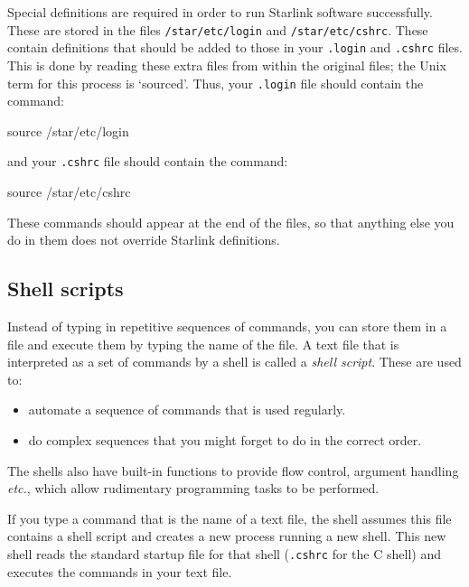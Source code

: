\documentclass[twoside,11pt,nolof]{starlink}
\begin{document}
Special definitions are required in order to run Starlink software successfully.
These are stored in the files \texttt{/star/etc/login} and \texttt{/star/etc/cshrc}.
These contain definitions that should be added to those in your \texttt{.login} and
\texttt{.cshrc} files.
This is done by reading these extra files from within the original files; the
Unix term for this process is `sourced'.
Thus, your \texttt{.login} file should contain the command:
\begin{terminalv}
source /star/etc/login
\end{terminalv}
and your \texttt{.cshrc} file should contain the command:
\begin{terminalv}
source /star/etc/cshrc
\end{terminalv}
These commands should appear at the end of the files, so that anything else
you do in them does not override Starlink definitions.

\subsection{Shell scripts\label{ss2}}

Instead of typing in repetitive sequences of commands, you can store them
in a file and execute them by typing the name of the file.
A text file that is interpreted as a set of commands by a shell is called a
\emph{shell script}.
These are used to:
\begin{itemize}
\item automate a sequence of commands that is used regularly.
\item do complex sequences that you might forget to do in the correct order.
\end{itemize}
The shells also have built-in functions to provide flow control, argument
handling \emph{etc.}, which allow rudimentary programming tasks to be performed.

If you type a command that is the name of a text file, the shell assumes this
file contains a shell script and creates a new process running a new shell.
This new shell reads the standard startup file for that shell (\texttt{.cshrc}
for the C shell) and executes the commands in your text file.
\end{document}
